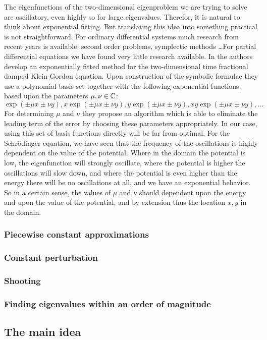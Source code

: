 The eigenfunctions of the two-dimensional eigenproblem we are trying to solve are oscillatory, even highly so for large eigenvalues. Therefor, it is natural to think about exponential fitting. But translating this idea into something practical is not straightforward. For ordinary differential systems much research from recent years is available: second order problems\cite{dambrosio_exponentially_2011,}, symplectic methods \cite{vandenberghe_symplectic_2011,wu_explicit_2012}\dots For partial differential equations we have found very little research available. In \cite{zahra_exponentially_2019} the authors develop an exponentially fitted method for the two-dimensional time fractional damped Klein-Gordon equation. Upon construction of the symbolic formulae they use a polynomial basis set together with the following exponential functions, based upon the parameters $\mu, \nu \in \mathbb{C}$:
$$
    \exp(\pm\mu x \pm\nu y), x\exp(\pm\mu x \pm\nu y), y\exp(\pm\mu x \pm\nu y), x y \exp(\pm\mu x \pm\nu y), \dots
$$
For determining $\mu$ and $\nu$ they propose an algorithm which is able to eliminate the leading term of the error by choosing these parameters appropriately. In our case, using this set of basis functions directly will be far from optimal. For the Schrödinger equation, we have seen that the frequency of the oscillations is highly dependent on the value of the potential. Where in the domain the potential is low, the eigenfunction will strongly oscillate, where the potential is higher the oscillations will slow down, and where the potential is even higher than the energy there will be no oscillations at all, and we have an exponential behavior. So in a certain sense, the values of $\mu$ and $\nu$ should dependent upon the energy and upon the value of the potential, and by extension thus the location $x, y$ in the domain.


\subsubsection{Piecewise constant approximations}


\subsubsection{Constant perturbation}


\subsubsection{Shooting}


\subsubsection{Finding eigenvalues within an order of magnitude}


\subsection{The main idea}




\stopchapter
